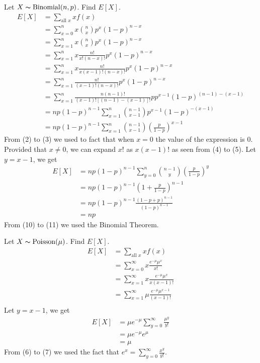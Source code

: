 Let $ X \thicksim \operatorname{Binomial}(n,p) $. Find $ E[X] $.
\setcounter{equation}{0}
\begin{align}
    E[X] & =\sum\limits_{\text{all } x}x f(x)                                                    \\
         & =\sum\limits_{x=0}^{n}x \binom{n}{x}p^x(1-p)^{n-x}                                    \\
         & =\sum\limits_{x=1}^{n}x \binom{n}{x}p^x(1-p)^{n-x}                                    \\
         & =\sum\limits_{x=1}^{n}x \frac{n!}{x!(n-x)!}p^x(1-p)^{n-x}                             \\
         & =\sum\limits_{x=1}^{n}x \frac{n!}{x(x-1)!(n-x)!}p^x(1-p)^{n-x}                        \\
         & =\sum\limits_{x=1}^{n}\frac{n!}{(x-1)!(n-x)!}p^x(1-p)^{n-x}                           \\
         & =\sum\limits_{x=1}^{n}\frac{n(n-1)!}{(x-1)![(n-1)-(x-1)]!}pp^{x-1}(1-p)^{(n-1)-(x-1)} \\
         & =np(1-p)^{n-1}\sum\limits_{x=1}^{n}\binom{n-1}{x-1}p^{x-1}(1-p)^{-(x-1)}              \\
         & =np(1-p)^{n-1}\sum\limits_{x=1}^{n}\binom{n-1}{x-1}\left(\frac{p}{1-p}\right)^{x-1}
\end{align}
From (2) to (3) we used to fact that when $ x=0 $ the value of the expression
is $ 0 $. Provided that $ x\neq 0 $, we can expand $ x! $ as $ x(x-1)! $ as
seen from (4) to (5). Let $ y=x-1 $, we get
\begin{align}
    E[X] & =np(1-p)^{n-1}\sum\limits_{y=0}^{n}\binom{n-1}{y}\left(\frac{p}{1-p}\right)^{y} \\
         & =np(1-p)^{n-1}\left(1+\frac{p}{1-p}\right)^{n-1}                                \\
         & =np(1-p)^{n-1}\frac{(1-p+p)^{n-1}}{(1-p)^{n-1}}                                 \\
         & =np
\end{align}
From (10) to (11) we used the Binomial Theorem.

Let $ X \thicksim \operatorname{Poisson}(\mu) $. Find $ E[X] $.
\setcounter{equation}{0}
\begin{align}
    E[X] & =\sum\limits_{\text{all } x}x f(x)                               \\
         & =\sum\limits_{x=0}^{\infty} x \frac{e^{-\mu}\mu^x}{x!}           \\
         & =\sum\limits_{x=1}^{\infty} x \frac{e^{-\mu}\mu^x}{x(x-1)!}      \\
         & =\sum\limits_{x=1}^{\infty} \mu \frac{e^{-\mu}\mu^{x-1}}{(x-1)!} \\
\end{align}
Let $ y=x-1 $, we get
\begin{align}
    E[X] & =\mu e^{-\mu}\sum\limits_{y=0}^{\infty} \frac{\mu^{y}}{y!} \\
         & =\mu e^{-\mu}e^\mu                                         \\
         & =\mu
\end{align}
From (6) to (7) we used the fact that $ e^x=\sum\limits_{y=0}^{\infty}\frac{x^y}{y!} $.

